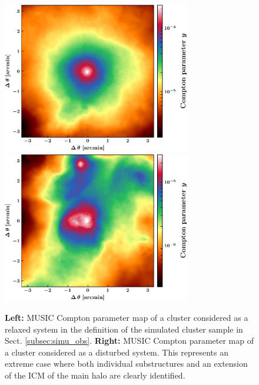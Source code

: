 \documentclass[twocolumn,traditabstract]{aa}
\begin{document}
\begin{figure}[h!]
\centering
\includegraphics[height=6.6cm]{Definition_relax.pdf}
\hspace{0.6cm}
\includegraphics[height=6.6cm]{Definition_disturbed.pdf}
\caption{{\footnotesize \textbf{Left:} MUSIC Compton parameter map of a cluster considered as a relaxed system in the definition of the simulated cluster sample in Sect. \ref{subsec:simu_obs}.  \textbf{Right:} MUSIC Compton parameter map of a cluster considered as a disturbed system. This represents an extreme case where both individual substructures and an extension of the ICM of the main halo are clearly identified.}}
\label{fig:def_relax_disturbed}
\end{figure}
\end{document}
